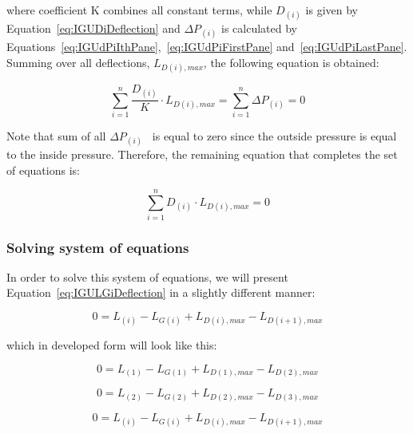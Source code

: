 where coefficient K combines all constant terms, while \({D_{\left( i \right)}}\) is given by Equation~\ref{eq:IGUDiDeflection} and \(\Delta {P_{\left( i \right)}}\) is calculated by Equations~\ref{eq:IGUdPiIthPane},~\ref{eq:IGUdPiFirstPane} and~\ref{eq:IGUdPiLastPane}. Summing over all deflections, \({L_{D\left( i \right),max}}\), the following equation is obtained:

\begin{equation}
\mathop \sum \limits_{i = 1}^n \frac{{{D_{\left( i \right)}}}}{K}\cdot {L_{D\left( i \right),max}} = \mathop \sum \limits_{i = 1}^n \Delta {P_{\left( i \right)}} = 0
\end{equation}

Note that sum of all \(\Delta {P_{\left( i \right)}}\) ~is equal to zero since the outside pressure is equal to the inside pressure. Therefore, the remaining equation that completes the set of equations is:

\begin{equation}
\mathop \sum \limits_{i = 1}^n {D_{\left( i \right)}}\cdot {L_{D\left( i \right),max}} = 0
\label{eq:IGUSumDiLDiEq0}
\end{equation}

\subsubsection{Solving system of equations}\label{solving-system-of-equations}

In order to solve this system of equations, we will present Equation~\ref{eq:IGULGiDeflection} in a slightly different manner:

\begin{equation}
0 = {L_{\left( i \right)}} - {L_{G\left( i \right)}} + {L_{D\left( i \right),max}} - {L_{D\left( {i + 1} \right),max}}
\end{equation}

which in developed form will look like this:

\begin{equation}
0 = {L_{\left( 1 \right)}} - {L_{G\left( 1 \right)}} + {L_{D\left( 1 \right),max}} - {L_{D\left( 2 \right),max}}
\end{equation}

\begin{equation}
0 = {L_{\left( 2 \right)}} - {L_{G\left( 2 \right)}} + {L_{D\left( 2 \right),max}} - {L_{D\left( 3 \right),max}}
\end{equation}

\begin{equation}
0 = {L_{\left( i \right)}} - {L_{G\left( i \right)}} + {L_{D\left( i \right),max}} - {L_{D\left( {i + 1} \right),max}}
\end{equation}

